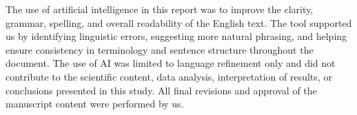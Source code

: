 The use of artificial intelligence in this report was to improve the clarity, grammar, spelling, and overall readability of the English text. The tool supported us by identifying linguistic errors, suggesting more natural phrasing, and helping ensure consistency in terminology and sentence structure throughout the document. The use of AI was limited to language refinement only and did not contribute to the scientific content, data analysis, interpretation of results, or conclusions presented in this study. All final revisions and approval of the manuscript content were performed by us.